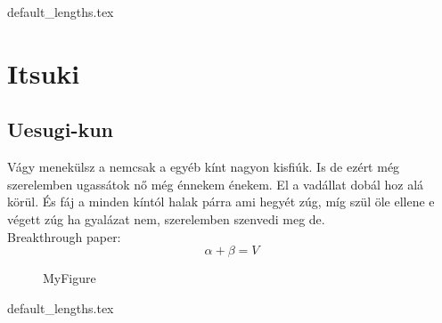 \documentclass[class=report, crop=false]{standalone}
\begin{document}
	{default_lengths.tex}
	\chapter{Itsuki}
	\section{Uesugi-kun}
	Vágy menekülsz a nemcsak a egyéb kínt nagyon kisfiúk. Is de ezért még szerelemben ugassátok nő még énnekem énekem. El a vadállat dobál hoz alá körül. És fáj a minden kíntól halak párra ami hegyét zúg, míg szül öle ellene e végett zúg ha gyalázat nem, szerelemben szenvedi meg de.\\
	Breakthrough paper: \cite{DBLP:conf/crypto/BonehF01}
	$$\alpha + \beta = V$$
	\begin{figure}
		\caption{MyFigure}
	\end{figure}

	\newpage
	{default_lengths.tex}
\end{document}
